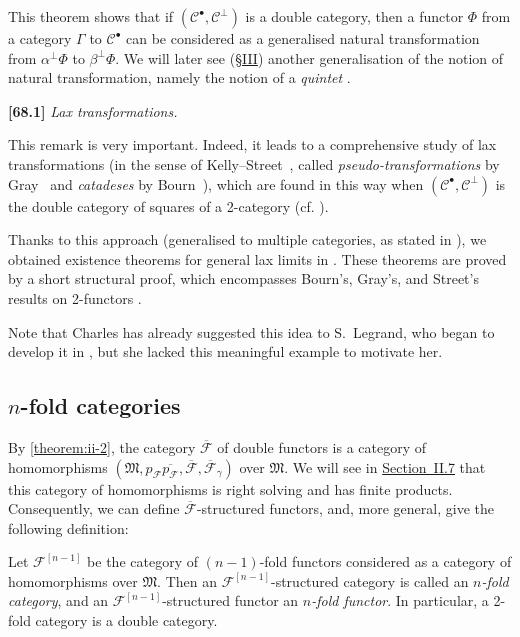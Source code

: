 \documentclass[a4paper,fleqn]{article}
\theoremstyle{plain}
\theoremstyle{definition}
\newenvironment{definition}[1]
  {\renewcommand\theinnerdefinition{#1}\innerdefinition}
  {\endinnerdefinition}
\newenvironment{longcomm}[1]
  {\noindent\textbf{[#1]}\rmfamily}
  {}
\newcommand{\CC}{\mathcal{C}}
\newcommand{\MM}{\mathfrak{M}}
\newcommand{\FF}{\mathcal{F}}
\begin{document}
This theorem shows that if $(\CC^\bullet,\CC^\perp)$ is a double category, then a functor $\Phi$ from a category $\Gamma$ to $\CC^\bullet$ can be considered as a generalised natural transformation from $\alpha^\perp\Phi$ to $\beta^\perp\Phi$.
We will later see (\hyperref[section:iii]{§III}) another generalisation of the notion of natural transformation, namely the notion of a \emph{quintet} \cite{3e}.

\begin{longcomm}{68.1}
  \emph{Lax transformations.}

  This remark is very important.
  Indeed, it leads to a comprehensive study of lax transformations (in the sense of Kelly--Street~\cite{comm59}, called \emph{pseudo-transformations} by Gray~\cite{comm40} and \emph{catadeses} by Bourn~\cite{comm14}), which are found in this way when $(\CC^\bullet,\CC^\perp)$ is the double category of squares of a 2-category (cf. \cite[Comment~105.1]{coll64}).

  Thanks to this approach (generalised to multiple categories, as stated in \cite[Remark~3, p.~399]{coll117}), we obtained existence theorems for general lax limits in \cite{coll119,coll121}.
  These theorems are proved by a short structural proof, which encompasses Bourn's, Gray's, and Street's results on 2-functors \cite{comm14,comm40,comm92}.

  Note that Charles has already suggested this idea to S.~Legrand, who began to develop it in \cite{comm67}, but she lacked this meaningful example to motivate her.
\end{longcomm}


\subsection{$n$-fold categories}
\label{section:ii-5}

By \cref{theorem:ii-2}, the category $\overline{\FF}$ of double functors is a category of homomorphisms $(\MM,p_\FF\overline{p_\FF},\overline{\FF},\overline{\FF}_\gamma)$ over $\MM$.
We will see in \hyperref[section:ii-7]{Section~II.7} that this category of homomorphisms is right solving and has finite products.
Consequently, we can define $\overline{\FF}$-structured functors, and, more general, give the following definition:

\begin{definition}{15}
\label{definition:ii-15}
  Let $\FF^{[n-1]}$ be the category of $(n-1)$-fold functors considered as a category of homomorphisms over $\MM$.
  Then an $\FF^{[n-1]}$-structured category is called an \emph{$n$-fold category}, and an $\FF^{[n-1]}$-structured functor an \emph{$n$-fold functor}.
  In particular, a 2-fold category is a double category.
\end{definition}
\end{document}
